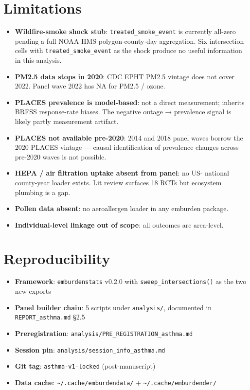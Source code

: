 \documentclass[
]{article}
\providecommand{\tightlist}{%
  \setlength{\itemsep}{0pt}\setlength{\parskip}{0pt}}
\begin{document}
\hypertarget{limitations}{%
\section{Limitations}\label{limitations}}

\begin{itemize}
\tightlist
\item
  \textbf{Wildfire-smoke shock stub}: \texttt{treated\_smoke\_event} is
  currently all-zero pending a full NOAA HMS polygon-county-day
  aggregation. Six intersection cells with
  \texttt{treated\_smoke\_event} as the shock produce no useful
  information in this analysis.
\item
  \textbf{PM2.5 data stops in 2020}: CDC EPHT PM2.5 vintage does not
  cover 2022. Panel wave 2022 has NA for PM2.5 / ozone.
\item
  \textbf{PLACES prevalence is model-based}: not a direct measurement;
  inherits BRFSS response-rate biases. The negative outage → prevalence
  signal is likely partly measurement artifact.
\item
  \textbf{PLACES not available pre-2020}: 2014 and 2018 panel waves
  borrow the 2020 PLACES vintage --- causal identification of prevalence
  changes across pre-2020 waves is not possible.
\item
  \textbf{HEPA / air filtration uptake absent from panel}: no US-
  national county-year loader exists. Lit review surfaces 18 RCTs but
  ecosystem plumbing is a gap.
\item
  \textbf{Pollen data absent}: no aeroallergen loader in any emburden
  package.
\item
  \textbf{Individual-level linkage out of scope}: all outcomes are
  area-level.
\end{itemize}

\hypertarget{reproducibility}{%
\section{Reproducibility}\label{reproducibility}}

\begin{itemize}
\tightlist
\item
  \textbf{Framework}: \texttt{emburdenstats} v0.2.0 with
  \texttt{sweep\_intersections()} as the two new exports
\item
  \textbf{Panel builder chain}: 5 scripts under \texttt{analysis/},
  documented in \texttt{REPORT\_asthma.md} §2.5
\item
  \textbf{Preregistration}:
  \texttt{analysis/PRE\_REGISTRATION\_asthma.md}
\item
  \textbf{Session pin}: \texttt{analysis/session\_info\_asthma.md}
\item
  \textbf{Git tag}: \texttt{asthma-v1-locked} (post-manuscript)
\item
  \textbf{Data cache}: \texttt{\textasciitilde{}/.cache/emburdendata/} +
  \texttt{\textasciitilde{}/.cache/emburdender/}
\end{itemize}
\end{document}
